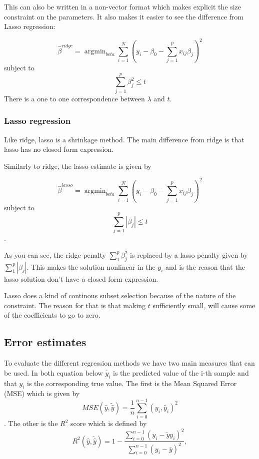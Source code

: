 This can also be written in a non-vector format which makes 
explicit the size constraint on the parameters. 
It also makes it easier to see the difference from Lasso regression:

\begin{equation}
	\hat{\beta}^{ridge} = \operatorname{argmin}_{beta} 
							\sum\limits_{i=1}^N \left(y_i - \beta_0
							-\sum\limits_{j=1}^p x_{ij}\beta_j\right)^2
\end{equation}
subject to
\begin{equation}
	\sum\limits_{j=1}^p \beta_j^2 \leq t
\end{equation}
There is a one to one correspondence between \(\lambda\) and \(t\).
\cite{IntroStatistics} 

\subsubsection{Lasso regression}\label{seq:lasso}
Like ridge, lasso is a shrinkage method. The main difference from 
ridge is that lasso has no closed form expression. ~\cite{IntroStatistics} 

Similarly to ridge, the lasso estimate is given by

\begin{equation}
	\hat{\beta}^{lasso} = \operatorname{argmin}_{beta} 
							\sum\limits_{i=1}^N \left(y_i - \beta_0
							-\sum\limits_{j=1}^p x_{ij}\beta_j\right)^2
\end{equation}
subject to
\begin{equation}
	\sum\limits_{j=1}^p |\beta_j| \leq t
\end{equation}.

As you can see, the ridge penalty \(\sum_1^p \beta_j^2\) is replaced 
by a lasso penalty given by \(\sum_1^p |\beta_j|\). 
This makes the solution nonlinear in the \(y_i\) and is the reason
that the lasso solution don't have a closed form expression.

Lasso does a kind of continous subset selection because of the nature of 
the constraint. The reason for that is that making \(t\) sufficiently small,
will cause some of the coefficients to go to zero. ~\cite{IntroStatistics} 

\subsection{Error estimates}
To evaluate the different regression methods we have two main
measures that can be used. In both equation below \(\widetilde{y_i}\) is 
the predicted value of the i-th sample and that \(y_i\) is the corresponding
true value. \cite{Project1} 
The first is the Mean Squared Error (MSE) which is given by 
\begin{equation}
	MSE(\hat{y}, \widetilde{\hat{y}}) = \frac{1}{n}\sum\limits_{i=0}^{n-1}
	(y_i, \widetilde{y_i})^2 
\end{equation}.
The other is the \(R^2\) score which is defined by
\begin{equation}
	R^2(\hat{y}, \tilde{\hat{y}}) = 1 - \frac{\sum_{i=0}^{n - 1} (y_i - \tilde{		y}	y_i)^2}{\sum_{i=0}^{n - 1} (y_i - \bar{y})^2},
\end{equation}


